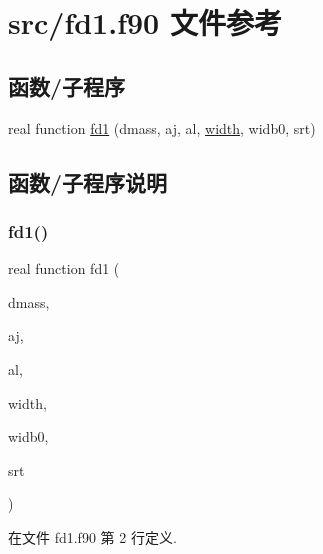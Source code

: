 \hypertarget{fd1_8f90}{}\section{src/fd1.f90 文件参考}
\label{fd1_8f90}
\subsection*{函数/子程序}
\begin{DoxyCompactItemize}
\item 
real function \mbox{\hyperlink{fd1_8f90_a15e3c378fe5e283ca0c0802615dedc6d}{fd1}} (dmass, aj, al, \mbox{\hyperlink{width_8f90_ad87dba8131333d4eb15220ebfac774e8}{width}}, widb0, srt)
\end{DoxyCompactItemize}


\subsection{函数/子程序说明}
\mbox{\label{fd1_8f90_a15e3c378fe5e283ca0c0802615dedc6d}} 
\subsubsection{\texorpdfstring{fd1()}{fd1()}}
{\footnotesize\ttfamily real function fd1 (\begin{DoxyParamCaption}\item[{}]{dmass,  }\item[{}]{aj,  }\item[{}]{al,  }\item[{}]{width,  }\item[{}]{widb0,  }\item[{}]{srt }\end{DoxyParamCaption})}



在文件 fd1.\+f90 第 2 行定义.

